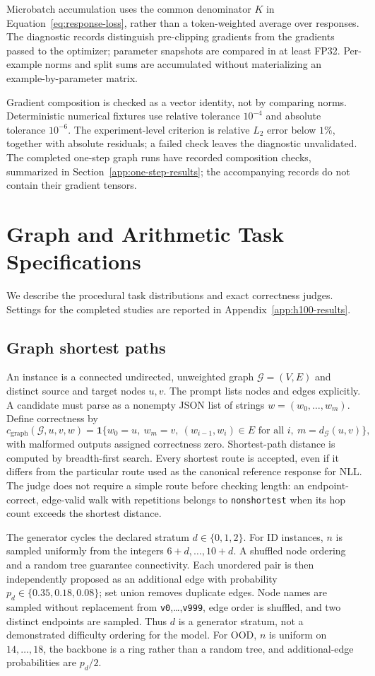 Microbatch accumulation uses the common denominator $K$ in
Equation~\eqref{eq:response-loss}, rather than a token-weighted average over
responses. The diagnostic records distinguish pre-clipping gradients from
the gradients passed to the optimizer; parameter snapshots are compared in
at least FP32. Per-example norms and split sums are accumulated without
materializing an example-by-parameter matrix.

Gradient composition is checked as a vector identity, not by comparing
norms. Deterministic numerical fixtures use relative tolerance $10^{-4}$
and absolute tolerance $10^{-6}$. The experiment-level criterion is relative $L_2$ error
below $1\%$, together with absolute residuals; a failed check leaves the
diagnostic unvalidated. The completed one-step graph runs have recorded
composition checks, summarized in Section~\ref{app:one-step-results};
the accompanying records do not contain their gradient tensors.

\section{Graph and Arithmetic Task Specifications}
\label{app:tasks}

We describe the procedural task distributions and exact correctness
judges. Settings for the completed studies are reported in
Appendix~\ref{app:h100-results}.

\subsection{Graph shortest paths}
An instance is a connected undirected, unweighted graph $\mathcal G=(V,E)$
and distinct source and target nodes $u,v$. The prompt lists nodes and
edges explicitly. A candidate must parse as a nonempty JSON list of strings
$w=(w_0,\ldots,w_m)$. Define correctness by
\[
 c_{\mathrm{graph}}(\mathcal G,u,v,w)
 =\mathbf1\{w_0=u,\ w_m=v,\ (w_{i-1},w_i)\in E\text{ for all }i,
                    \ m=d_{\mathcal G}(u,v)\},
\]
with malformed outputs assigned correctness zero.
Shortest-path distance is computed by breadth-first search.
Every shortest route is accepted, even if it differs from the particular
route used as the canonical reference response for NLL. The judge does not
require a simple route before checking length: an endpoint-correct,
edge-valid walk with repetitions belongs to \texttt{nonshortest} when
its hop count exceeds the shortest distance.

The generator cycles the declared stratum $d\in\{0,1,2\}$. For ID instances,
$n$ is sampled uniformly from the integers $6+d,\ldots,10+d$. A shuffled
node ordering and a random tree guarantee connectivity. Each unordered
pair is then independently proposed as an additional edge with probability
$p_d\in\{0.35,0.18,0.08\}$; set union removes duplicate edges. Node names
are sampled without replacement from \texttt{v0},\ldots,\texttt{v999}, edge
order is shuffled, and two distinct endpoints are sampled. Thus $d$ is a
generator stratum, not a demonstrated difficulty ordering for the model.
For OOD, $n$ is uniform on $14,\ldots,18$, the backbone is a ring rather
than a random tree, and additional-edge probabilities are $p_d/2$.

